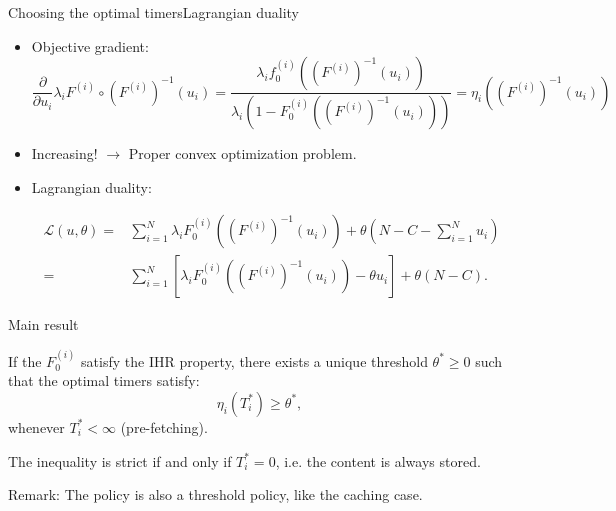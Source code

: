 \documentclass[aspectratio=169]{beamer}
\begin{document}
\begin{frame}{Choosing the optimal timers}{Lagrangian duality}

	\begin{itemize}
		\item Objective gradient:
		\begin{equation*}
			\frac{\partial}{\partial u_i} \lambda_i F^{(i)}\circ(F^{(i)})^{-1}(u_i) = \frac{\lambda_i f_0^{(i)}((F^{(i)})^{-1}(u_i))}{\lambda_i \left(1-F_0^{(i)}((F^{(i)})^{-1}(u_i))\right)} = \eta_i((F^{(i)})^{-1}(u_i))
		\end{equation*}

		\item \alert{Increasing!} $\to$ Proper convex optimization problem.
		
		\pause

		\item Lagrangian duality:
		
		\begin{align*}
  			\mathcal{L}(u,\theta) =& \sum_{i=1}^N \lambda_i F_0^{(i)}\left((F^{(i)})^{-1}(u_i)\right) + \theta \left(N-C - \sum_{i=1}^N u_i\right) \\
			=& \sum_{i=1}^N \left[\lambda_i F_0^{(i)}\left((F^{(i)})^{-1}(u_i)\right) - \theta u_i \right] + \theta (N-C).
		\end{align*}

	\end{itemize}

\end{frame}

\begin{frame}{Main result}

	\begin{theorem}
		If the $F_0^{(i)}$ satisfy the IHR property, there exists a unique threshold $\theta^*\geqslant 0$ such that the optimal timers satisfy:
		\begin{equation*}
		  \eta_i(T_i^*) \geqslant \theta^*,
		\end{equation*}
		whenever $T_i^*<\infty$ (pre-fetching). 
		
		The inequality is strict if and only if $T_i^*=0$, i.e. the content is always stored.
	\end{theorem}

	\pause

	\vfill
	
	\alert{Remark:}  The policy is also a threshold policy, like the caching case.

\end{frame}
\end{document}
